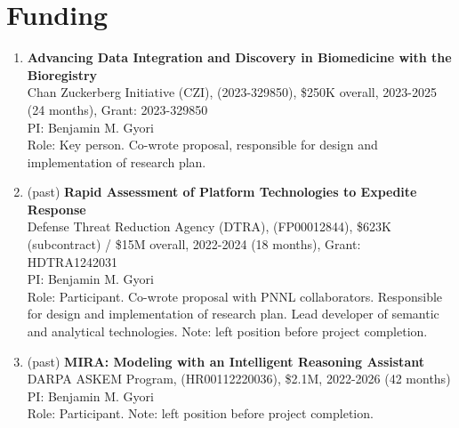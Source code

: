 \documentclass[10pt,a4paper,sans]{moderncv} %
\begin{document}
\section{Funding}\label{sec:funding}
    \begin{enumerate}
    \itemsep0.75em
    \item  \textbf{Advancing Data Integration and Discovery in Biomedicine with the Bioregistry}\\
        Chan Zuckerberg Initiative (CZI), (2023-329850), \$250K overall, 2023-2025 (24 months), Grant: 2023-329850\\
        PI: Benjamin M. Gyori\\
        Role: Key person. Co-wrote proposal, responsible for design and implementation of research plan.
    \item (past) \textbf{Rapid Assessment of Platform Technologies to Expedite Response}\\
        Defense Threat Reduction Agency (DTRA), (FP00012844), \$623K (subcontract) / \$15M overall, 2022-2024 (18 months), Grant: HDTRA1242031\\
        PI: Benjamin M. Gyori\\
        Role: Participant. Co-wrote proposal with PNNL collaborators. 
Responsible for design and implementation of research plan. 
Lead developer of semantic and analytical technologies.
Note: left position before project completion.

    \item (past) \textbf{MIRA: Modeling with an Intelligent Reasoning Assistant}\\
        DARPA ASKEM Program, (HR00112220036), \$2.1M, 2022-2026 (42 months)\\
        PI: Benjamin M. Gyori\\
        Role: Participant. 
Note: left position before project completion.


\end{enumerate}
\end{document}
